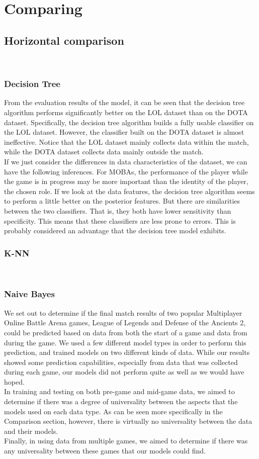 \documentclass[a4paper,fleqn]{cas-sc}
\begin{document}
\section{Comparing}
\subsection{Horizontal comparison}
\\
\subsubsection{Decision Tree}
From the evaluation results of the model, it can be seen that the decision tree algorithm performs significantly better on the LOL dataset than on the DOTA dataset. Specifically, the decision tree algorithm builds a fully usable classifier on the LOL dataset. However, the classifier built on the DOTA dataset is almost ineffective. Notice that the LOL dataset mainly collects data within the match, while the DOTA dataset collects data mainly outside the match.\\
If we just consider the differences in data characteristics of the dataset, we can have the following inferences. For MOBAs, the performance of the player while the game is in progress may be more important than the identity of the player, the chosen role. If we look at the data features, the decision tree algorithm seems to perform a little better on the posterior features. But there are similarities between the two classifiers. That is, they both have lower sensitivity than specificity. This means that these classifiers are less prone to errors. This is probably considered an advantage that the decision tree model exhibits.
\\
\subsubsection{K-NN}
\\
\subsubsection{Naive Bayes}
We set out to determine if the final match results of two popular Multiplayer Online Battle Arena games, League of Legends and Defense of the Ancients 2, could be predicted based on data from both the start of a game and data from during the game. We used a few different model types in order to perform this prediction, and trained models on two different kinds of data. While our results showed some prediction capabilities, especially from data that was collected during each game, our models did not perform quite as well as we would have hoped.\\
In training and testing on both pre-game and mid-game data, we aimed to determine if there was a degree of universality between the aspects that the models used on each data type. As can be seen more specifically in the Comparison section, however, there is virtually no universality between the data and their models.\\
Finally, in using data from multiple games, we aimed to determine if there was any universality between these games that our models could find.\\
\end{document}
